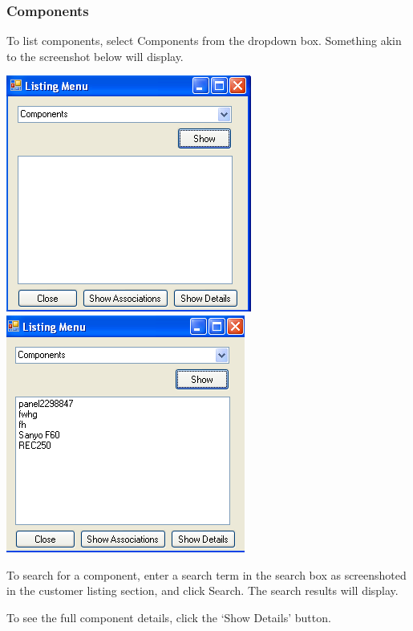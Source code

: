 		\subsubsection{Components}
		
		To list components, select Components from the dropdown box.  Something akin to the screenshot below will display.\footnotemark
		
		\includegraphics[scale=0.5]{component-frmList-first_scrot}
		\includegraphics[scale=0.5]{component-frmList-second_scrot}
		
		
		To search for a component, enter a search term in the search box as screenshoted in the customer listing section, and click Search.  The search results will display.
		
		To see the full component details, click the `Show Details' button.
		
